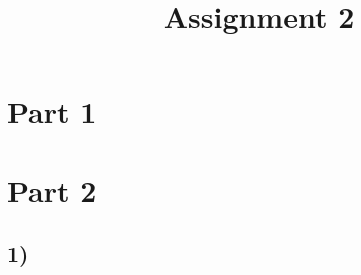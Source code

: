 \documentclass{article}
\title{Assignment 2}
\date{}
\author{}
\begin{document}
\maketitle
\section*{Part 1}
\section*{Part 2}
\subsection*{1)}
\end{document}
